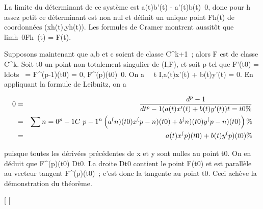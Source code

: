 La limite du déterminant de ce système est a(t)b'(t) -
a'(t)b(t)\neq~0, donc pour h assez petit ce
déterminant est non nul et définit un unique point Fh(t) de
coordonnées (xh(t),yh(t)). Les formules de Cramer
montrent aussitôt que
limh\rightarrow~0Fh~(t) = F(t).

Supposons maintenant que a,b et c soient de classe C^k+1~;
alors F est de classe C^k. Soit t0 un point non
totalement singulier de (I,F), et soit p tel que F'(t0) =
\\ldots~ =
F^(p-1)(t0) = 0,
F^(p)(t0)\neq~0. On a
\forall~~t \in I,a(t)x'(t) + b(t)y'(t) = 0. En
appliquant la formule de Leibnitz, on a

\begin{align*} 0& =& d^p-1
\over dt^p-1 (a(t)x'(t) +
b(t)y'(t))t=t0 \%& \\
& =& \sum n=0^p-1C~
p-1^n\left (a^(n)(t
0)x^(p-n)(t 0) + b^(n)(t
0)y^(p-n)(t 0)\right )\%&
\\ & =& a(t)x^(p)(t
0) + b(t)y^(p)(t 0) \%&
\\ \end{align*}

puisque toutes les dérivées précédentes de x et y sont nulles au point
t0. On en déduit que F^(p)(t0)
\in\overrightarrow Dt0. La droite
Dt0 contient le point F(t0) et est
parallèle au vecteur tangent F^(p)(t0)~; c'est donc
la tangente au point t0. Ceci achève la démonstration du
théorème.

{[}
{[}
